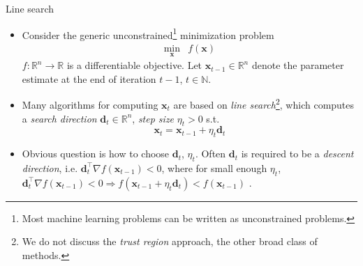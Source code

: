 \documentclass{beamer}
\numberwithin{equation}{section}
\begin{document}
\begin{frame}{Line search}
    \begin{itemize}
        \item
        Consider the generic unconstrained\footnote{
            Most machine learning problems can be written as unconstrained
            problems.
        } minimization problem
        \begin{equation} \label{eq:unconstrained_min}
            \begin{array}{ll}
                \displaystyle\min_\mathbf{x} & f(\mathbf{x})
            \end{array}
        \end{equation}
        $ f : \mathbb{R}^n \rightarrow \mathbb{R} $ is a differentiable
        objective. Let $ \mathbf{x}_{t - 1} \in \mathbb{R}^n $ denote the
        parameter estimate at the end of iteration $ t - 1 $,
        $ t \in \mathbb{N} $.

        \item
        Many algorithms for computing $ \mathbf{x}_t $ are based on
        \textit{line search}\footnote{
            We do not discuss the \textit{trust region} approach, the other
            broad class of methods.
        }, which computes a \textit{search direction}
        $ \mathbf{d}_t \in \mathbb{R}^n $, \textit{step size}
        $ \eta_t > 0 $ s.t. \cite{nocedal_opt}
        \begin{equation} \label{eq:line_search_eq}
            \mathbf{x}_t = \mathbf{x}_{t - 1} + \eta_t\mathbf{d}_t
        \end{equation}

        \item
        Obvious question is how to choose $ \mathbf{d}_t $, $ \eta_t $. Often
        $ \mathbf{d}_t $ is required to be a \textit{descent direction}, i.e.
        $ \mathbf{d}_t^\top\nabla f(\mathbf{x}_{t - 1}) < 0 $, where for small
        enough $ \eta_t $, $ \mathbf{d}_t^\top\nabla f(\mathbf{x}_{t - 1}) < 0
        \Rightarrow f(\mathbf{x}_{t - 1} + \eta_t\mathbf{d}_t) <
        f(\mathbf{x}_{t - 1}) $ \cite{nocedal_opt}.
    \end{itemize}

    \medskip
\end{frame}
\end{document}

